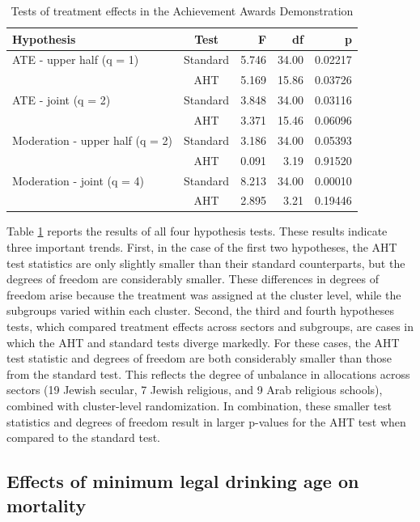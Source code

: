 \documentclass[12pt]{article}\usepackage[]{graphicx}\usepackage[]{color}
\begin{document}
\begin{table}[bth]
\centering
\begin{tabular}{lcrrr}
  \toprule
Hypothesis & Test & F & df & p \\ 
  \midrule
ATE - upper half (q = 1) & Standard & 5.746 & 34.00 & 0.02217 \\ 
   & AHT & 5.169 & 15.86 & 0.03726 \\ 
  ATE - joint (q = 2) & Standard & 3.848 & 34.00 & 0.03116 \\ 
   & AHT & 3.371 & 15.46 & 0.06096 \\ 
   \midrule
Moderation - upper half (q = 2) & Standard & 3.186 & 34.00 & 0.05393 \\ 
   & AHT & 0.091 & 3.19 & 0.91520 \\ 
  Moderation - joint (q = 4) & Standard & 8.213 & 34.00 & 0.00010 \\ 
   & AHT & 2.895 & 3.21 & 0.19446 \\ 
   \bottomrule
\end{tabular}
\caption{Tests of treatment effects in the Achievement Awards Demonstration} 
\label{tab:AAD}
\end{table}


Table \ref{tab:AAD} reports the results of all four hypothesis tests. 
These results indicate three important trends.
First, in the case of the first two hypotheses, the AHT test statistics are only slightly smaller than their standard counterparts, but the degrees of freedom are considerably smaller. 
These differences in degrees of freedom arise because the treatment was assigned at the cluster level, while the subgroups varied within each cluster. 
Second, the third and fourth hypotheses tests, which compared treatment effects across sectors and subgroups, are cases in which the AHT and standard tests diverge markedly.
For these cases, the AHT test statistic and degrees of freedom are both considerably smaller than those from the standard test. 
This reflects the degree of unbalance in allocations across sectors (19 Jewish secular, 7 Jewish religious, and 9 Arab religious schools), combined with cluster-level randomization. 
In combination, these smaller test statistics and degrees of freedom result in larger p-values for the AHT test when compared to the standard test.

\subsection{Effects of minimum legal drinking age on mortality} 
\end{document}
